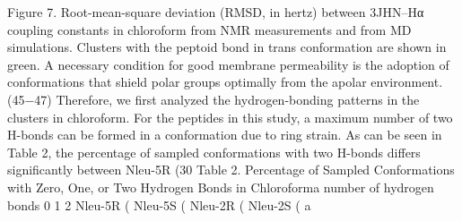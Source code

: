 Figure 7. Root-mean-square deviation (RMSD, in hertz) between 3JHN–Hα coupling constants in chloroform from NMR measurements and from MD simulations. Clusters with the peptoid bond in trans conformation are shown in green.
A necessary condition for good membrane permeability is the adoption of conformations that shield polar groups optimally from the apolar environment.(45−47) Therefore, we first analyzed the hydrogen-bonding patterns in the clusters in chloroform. For the peptides in this study, a maximum number of two H-bonds can be formed in a conformation due to ring strain. As can be seen in Table 2, the percentage of sampled conformations with two H-bonds differs significantly between Nleu-5R (30%
Table 2. Percentage of Sampled Conformations with Zero, One, or Two Hydrogen Bonds in Chloroforma
number of hydrogen bonds	0	1	2
Nleu-5R (%
Nleu-5S (%
Nleu-2R (%
Nleu-2S (%
a

